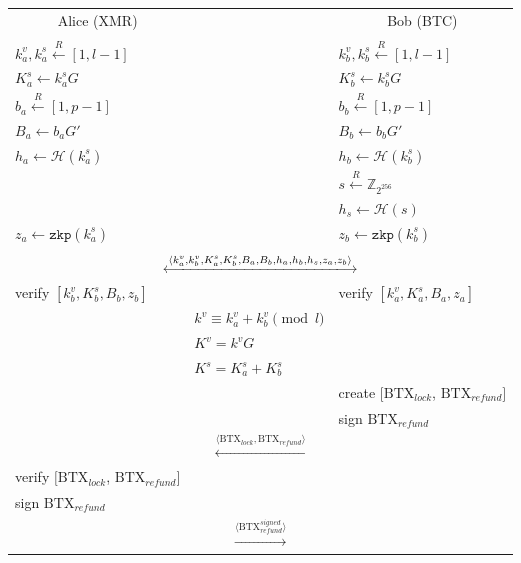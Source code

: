 \documentclass{llncs}
\renewcommand{\arraystretch}{1.5}
\begin{document}
\begin{figure}[H]
    \begin{table}[H]
      \centering
      {\renewcommand{\arraystretch}{1.2}%
      \begin{tabular}{ | l l l | }
        \hline
          \multicolumn{1}{|c}{Alice (XMR)} &  & \multicolumn{1}{c|}{Bob (BTC)} \\
          & & \\
          $k^v_a, k^s_a \xleftarrow{R} [1, l-1]$ & & $k^v_b, k^s_b \xleftarrow{R} [1, l-1]$ \\
          $K^s_a \leftarrow k^s_aG$ & & $K^s_b \leftarrow k^s_bG$ \\
          $b_a \xleftarrow{R} [1, p-1]$ & & $b_b \xleftarrow{R} [1, p-1]$ \\
          $B_a \leftarrow b_aG'$ & & $B_b \leftarrow b_bG'$ \\
          $h_a \leftarrow \mathcal{H}(k^s_a)$ & & $h_b \leftarrow \mathcal{H}(k^s_b)$ \\
          & & $s \xleftarrow{R} \mathbb{Z}_{2^{256}}$ \\
          & & $h_s \leftarrow \mathcal{H}(s)$ \\
          $z_a \leftarrow \texttt{zkp}(k^s_a)$ & & $z_b \leftarrow \texttt{zkp}(k^s_b)$ \\
           & & \\
          \multicolumn{3}{|c|}{$\xlongleftrightarrow{\langle k^v_a, k^v_b, K^s_a, K^s_b, B_a, B_b, h_a, h_b, h_s, z_a, z_b \rangle}$} \\
          verify $[k^v_b, K^s_b, B_b, z_b]$ & & verify $[k^v_a, K^s_a, B_a, z_a]$ \\
          & $k^v \equiv k^v_a + k^v_b \pmod l$ & \\
          & $K^v = k^vG$ & \\
          & $K^s = K^s_a + K^s_b$ & \\
          & & create $[\text{BTX}_\textit{lock}$, $\text{BTX}_\textit{refund}]$ \\
          & & sign $\text{BTX}_\textit{refund}$ \\
          \multicolumn{3}{|c|}{$\xleftarrow{\langle \text{BTX}_\textit{lock}, \text{BTX}_\textit{refund} \rangle}$} \\
          verify $[\text{BTX}_\textit{lock}$, $\text{BTX}_\textit{refund}]$ & & \\
          sign $\text{BTX}_\textit{refund}$ & & \\
          \multicolumn{3}{|c|}{$\xrightarrow{\langle \text{BTX}_\textit{refund}^\textit{signed} \rangle}$} \\

\end{tabular}}
\end{table}
\end{figure}
\end{document}
